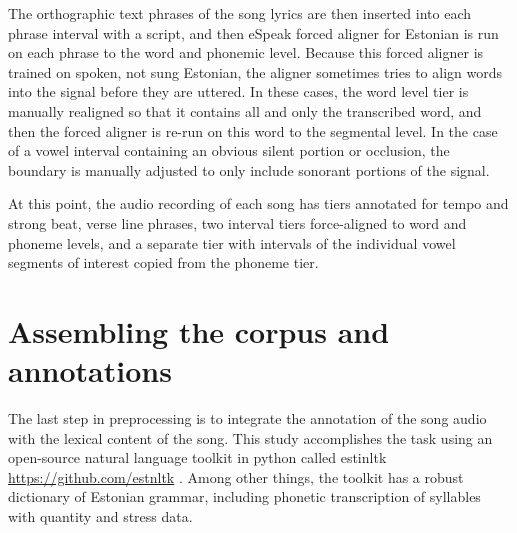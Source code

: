 The orthographic text phrases of the song lyrics are then inserted into each phrase interval with a script, and then eSpeak forced aligner for Estonian \citep{duddingtonESpeakSpeechSynthesizer1995} is run on each phrase to the word and phonemic level. Because this forced aligner is trained on spoken, not sung Estonian, the aligner sometimes tries to align words into the signal before they are uttered. In these cases, the word level tier is manually realigned so that it contains all and only the transcribed word, and then the forced aligner is re-run on this word to the segmental level. In the case of a vowel interval containing an obvious silent portion or occlusion, the boundary is manually adjusted to only include sonorant portions of the signal. 
%			
%	

At this point, the audio recording of each song has tiers annotated for tempo and strong beat, verse line phrases, two interval tiers force-aligned to word and phoneme levels, and a separate tier with intervals of the individual vowel segments of interest copied from the phoneme tier.
\section{Assembling the corpus and annotations}
The last step in preprocessing is to integrate the annotation of the song audio with the lexical content of the song. This study accomplishes the task using an open-source natural language toolkit in python called estinltk \url{https://github.com/estnltk} \citep{laur-EtAl:2020:LREC}. Among other things, the toolkit has a robust dictionary of Estonian grammar, including phonetic transcription of syllables with quantity and stress data. 



